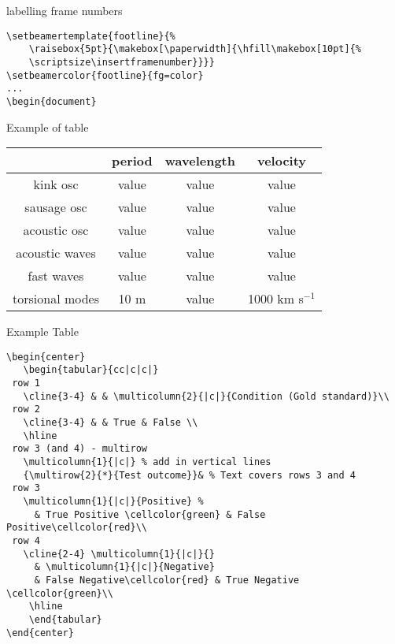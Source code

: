 \documentclass[9pt]{beamer}
\begin{document}
\begin{frame}[fragile=singleslide]{labelling frame numbers}
    \begin{verbatim}
\setbeamertemplate{footline}{%
    \raisebox{5pt}{\makebox[\paperwidth]{\hfill\makebox[10pt]{%
    \scriptsize\insertframenumber}}}}
\setbeamercolor{footline}{fg=color}
...
\begin{document}
    \end{verbatim}
\end{frame}%
\begin{frame}{Example of table}
    \begin{center}
        \begin{tabular}{c|c|c|c|}
            \cline{2-4} & {\textbf{period}} & {\textbf{wavelength}} &
                {\textbf{velocity}}\\
            \hline \multicolumn{0}{|c|}{kink osc} & value & value & value\\
            \hline \multicolumn{0}{|c|}{sausage osc} & value & value & value\\
            \hline \multicolumn{0}{|c|}{acoustic osc} & value & value & value\\
            \hline \multicolumn{0}{|c|}{acoustic waves} & value & value & value\\
            \hline \multicolumn{0}{|c|}{fast waves} & value & value & value\\
            \hline \multicolumn{0}{|c|}{torsional modes} & 10 m & value &
                1000 km s$^{-1}$\\
            \hline
        \end{tabular}
    \end{center}
\end{frame}%
\begin{frame}[fragile=singleslide]{Example Table}
    \begin{verbatim}
\begin{center}
   \begin{tabular}{cc|c|c|}
 row 1
   \cline{3-4} & & \multicolumn{2}{|c|}{Condition (Gold standard)}\\
 row 2
   \cline{3-4} & & True & False \\
   \hline
 row 3 (and 4) - multirow
   \multicolumn{1}{|c|} % add in vertical lines
   {\multirow{2}{*}{Test outcome}}& % Text covers rows 3 and 4
 row 3
   \multicolumn{1}{|c|}{Positive} %
     & True Positive \cellcolor{green} & False Positive\cellcolor{red}\\
 row 4
   \cline{2-4} \multicolumn{1}{|c|}{}
     & \multicolumn{1}{|c|}{Negative}
     & False Negative\cellcolor{red} & True Negative \cellcolor{green}\\
    \hline
    \end{tabular}
\end{center}
    \end{verbatim}
\end{frame}%
\end{document}
